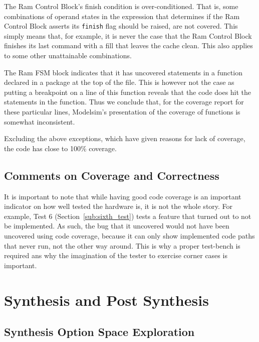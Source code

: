 \documentclass[]{article}
\begin{document}
The Ram Control Block's finish condition is over-conditioned. That is, some combinations of operand states in the expression that determines if the Ram Control Block asserts its \verb"finish" flag should be raised, are not covered. This simply means that, for example, it is never the case that the Ram Control Block finishes its last command with a fill that leaves the cache clean. This also applies to some other unattainable combinations.

The Ram FSM block indicates that it has uncovered statements in a function declared in a package at the top of the file. This is however not the case as putting a breakpoint on a line of this function reveals that the code does hit the statements in the function. Thus we conclude that, for the coverage report for these particular lines, Modelsim's presentation of the coverage of functions is somewhat inconsistent.

Excluding the above exceptions, which have given reasons for lack of coverage, the code has close to 100\% coverage.

\subsection{Comments on Coverage and Correctness} %
\label{sub:comments_on_coverage_and_correctness}

It is important to note that while having good code coverage is an important indicator on how well tested the hardware is, it is not the whole story. For example, Test 6 (Section~\ref{sub:sixth_test}) tests a feature that turned out to not be implemented.
As such, the bug that it uncovered would not have been uncovered using code coverage, because it can only show implemented code paths that never run, not the other way around. This is why a proper test-bench is required ans why the imagination of the tester to exercise corner cases is important.



\section{Synthesis and Post Synthesis} %
\label{sec:synthesis_and_post_synthesis}

\subsection{Synthesis Option Space Exploration} %
\end{document}
